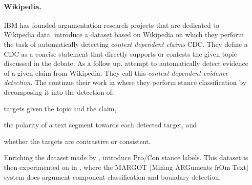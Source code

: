 \paragraph{Wikipedia.} IBM has founded argumentation research projects that are dedicated 
to Wikipedia data. \citet{levy2014context} introduce a dataset 
based on Wikipedia on which they perform 
the task of automatically detecting \emph{context dependent claims} CDC.
 They define a CDC as a concise statement that
directly supports or contests the given topic
discussed in the debate. As a follow up, \citet{rinott2015show} 
attempt to automatically detect evidence of a given claim from Wikipedia.
They call this \emph{context dependent evidence detection}. 
The continue their work in \citep{bar2017stance} where they 
perform stance classification by decomposing it into the detection of: 
\begin{enumerate*}
	\item targets given the topic and the claim,
	\item the polarity of a text segment towards each detected target, and
	\item whether the targets are contrastive or consistent. 
\end{enumerate*}
Enriching the dataset made by \citet{levy2014context}, \citet{bar2017stance}
introduce Pro/Con stance labels. This dataset is then experimented on 
in \citep{lippi2016margot}, where the MARGOT (Mining ARGuments frOm Text) system
does argument component classification and boundary detection. 

